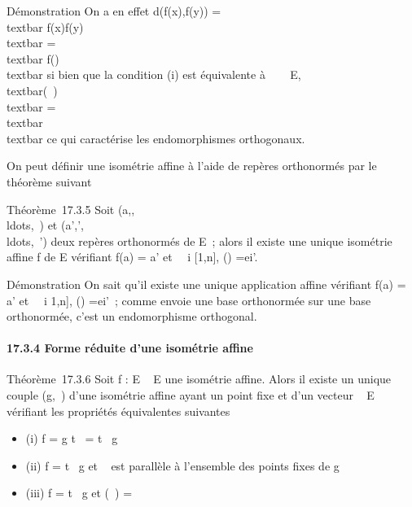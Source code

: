 Démonstration On a en effet d(f(x),f(y))
=\\textbar{}\overrightarrow
f(x)f(y)\\textbar{}
=\\textbar{}\vec
f(\overrightarrowxy)\\textbar{} si
bien que la condition (i) est équivalente à
\forall~\overrightarrow\xi~~
\in\overrightarrow E,
\\textbar{}\vecf(\overrightarrow\xi~)\\textbar{}
=\\textbar{}\overrightarrow
\xi~\\textbar{} ce qui caractérise les endomorphismes
orthogonaux.

On peut définir une isométrie affine à l'aide de repères orthonormés par
le théorème suivant

Théorème~17.3.5 Soit
(a,,\\ldots,\vecen~)
et
(a',',\\ldots,\vecen~')
deux repères orthonormés de E~; alors il existe une unique isométrie
affine f de E vérifiant f(a) = a' et \forall~~i \in
{[}1,n{]}, \vecf(\vecei)
=\vec ei'.

Démonstration On sait qu'il existe une unique application affine
vérifiant f(a) = a' et \forall~~i \in {[}1,n{]},
\vecf(\vecei)
=\vec ei'~; comme \vecf
envoie une base orthonormée sur une base orthonormée, c'est un
endomorphisme orthogonal.

\paragraph{17.3.4 Forme réduite d'une isométrie affine}

Théorème~17.3.6 Soit f : E \rightarrow~ E une isométrie affine. Alors il existe un
unique couple (g,\overrightarrow\xi~) d'une isométrie
affine ayant un point fixe et d'un vecteur
\overrightarrow\xi~ \in\overrightarrow
E vérifiant les propriétés équivalentes suivantes

\begin{itemize}
\itemsep1pt\parskip0pt
\item
  (i) f = g \cdot t\overrightarrow\xi~ =
  t\overrightarrow\xi~ \cdot g
\item
  (ii) f = t\overrightarrow\xi~ \cdot g et
  \overrightarrow\xi~ est parallèle à l'ensemble des
  points fixes de g
\item
  (iii) f = t\overrightarrow\xi~ \cdot g et
  \vecf(\overrightarrow\xi~)
  =\overrightarrow \xi~
\end{itemize}

